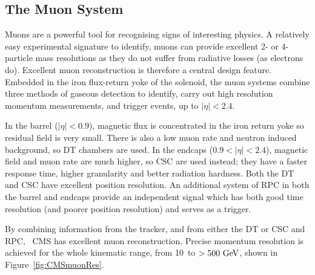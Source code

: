 
\subsection{The Muon System}
Muons are a powerful tool for recognising signs of interesting physics. 
A relatively easy experimental signature to identify, muons can provide excellent 2- or 4-particle mass resolutions as they do not suffer from radiative losses (as electrons do).
Excellent muon reconstruction is therefore a central design feature. 
Embedded in the iron flux-return yoke of the solenoid, the muon systems combine three methods of gaseous detection to identify, carry out high resolution momentum measurements, and trigger events, up to $|\eta|<2.4$.

In the barrel ($|\eta|<0.9$), magnetic flux is concentrated in the iron return yoke so residual field is very small.
There is also a low muon rate and neutron induced background, so \ac{DT} chambers are used.
In the endcaps ($0.9<|\eta|<2.4$), magnetic field and muon rate are much higher, so \ac{CSC} are used instead; 
they have a faster response time, higher granularity and better radiation hardness.
Both the \ac{DT} and \ac{CSC} have excellent position resolution.
An additional system of \ac{RPC} in both the barrel and endcaps provide an independent signal which has both good time resolution (and poorer position resolution) and serves as a trigger.

By combining information from the tracker, and from either the \ac{DT} or \ac{CSC} and \ac{RPC}, ~\ac{CMS} has excellent muon reconstruction. 
Precise momentum resolution is achieved for the whole kinematic range, from 10~\GeV to $>500~\mathrm{GeV}$, shown in  
Figure~\ref{fig:CMSmuonRes}. 

